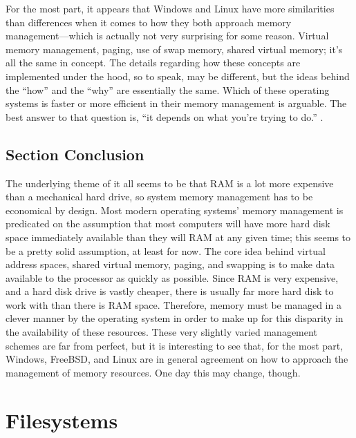 \documentclass[onecolumn, draftclsnofoot,10pt, compsoc]{IEEEtran}
\begin{document}
\noindent For the most part, it appears that Windows and Linux have more similarities than differences when it comes to how they both approach memory management–--which is actually not very surprising for some reason. Virtual memory management, paging, use of swap memory, shared virtual memory; it’s all the same in concept. The details regarding how these concepts are implemented under the hood, so to speak, may be different, but the ideas behind the “how” and the “why” are essentially the same. Which of these operating systems is faster or more efficient in their memory management is arguable. The best answer to that question is, “it depends on what you’re trying to do.” \cite{Linux1Mem} \cite{Linux}.\\

\subsection{Section Conclusion}
\noindent The underlying theme of it all seems to be that RAM is a lot more expensive than a mechanical hard drive, so system memory management has to be economical by design. Most modern operating systems’ memory management is predicated on the assumption that most computers will have more hard disk space immediately available than they will RAM at any given time; this seems to be a pretty solid assumption, at least for now. The core idea behind virtual address spaces, shared virtual memory, paging, and swapping is to make data available to the processor as quickly as possible. Since RAM is very expensive, and a hard disk drive is vastly cheaper, there is usually far more hard disk to work with than there is RAM space. Therefore, memory must be managed in a clever manner by the operating system in order to make up for this disparity in the availability of these resources. These very slightly varied management schemes are far from perfect, but it is interesting to see that, for the most part, Windows, FreeBSD, and Linux are in general agreement on how to approach the management of memory resources. One day this may change, though.\\

\newpage
\section{Filesystems}
\end{document}
